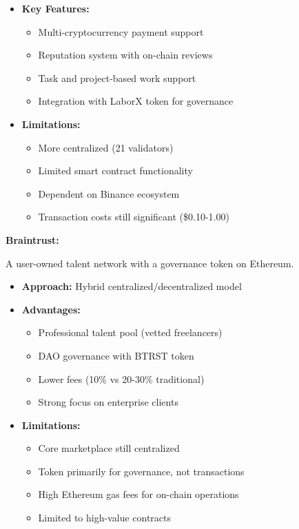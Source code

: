\documentclass[a4paper,13pt,twoside]{report}
\theoremstyle{definition}
\begin{document}
\begin{itemize}
    \item \textbf{Key Features:}
    \begin{itemize}
        \item Multi-cryptocurrency payment support
        \item Reputation system with on-chain reviews
        \item Task and project-based work support
        \item Integration with LaborX token for governance
    \end{itemize}
    \item \textbf{Limitations:}
    \begin{itemize}
        \item More centralized (21 validators)
        \item Limited smart contract functionality
        \item Dependent on Binance ecosystem
        \item Transaction costs still significant (\$0.10-1.00)
    \end{itemize}
\end{itemize}

\textbf{Braintrust:}

A user-owned talent network with a governance token on Ethereum.

\begin{itemize}
    \item \textbf{Approach:} Hybrid centralized/decentralized model
    \item \textbf{Advantages:}
    \begin{itemize}
        \item Professional talent pool (vetted freelancers)
        \item DAO governance with BTRST token
        \item Lower fees (10\% vs 20-30\% traditional)
        \item Strong focus on enterprise clients
    \end{itemize}
    \item \textbf{Limitations:}
    \begin{itemize}
        \item Core marketplace still centralized
        \item Token primarily for governance, not transactions
        \item High Ethereum gas fees for on-chain operations
        \item Limited to high-value contracts
    \end{itemize}
\end{itemize}
\end{document}
